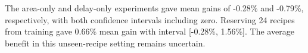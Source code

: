 The area-only and delay-only experiments gave mean gains of -0.28\% and -0.79\%, respectively, with both confidence intervals including zero. Reserving 24 recipes from training gave 0.66\% mean gain with interval [-0.28\%, 1.56\%]. The average benefit in this unseen-recipe setting remains uncertain.
